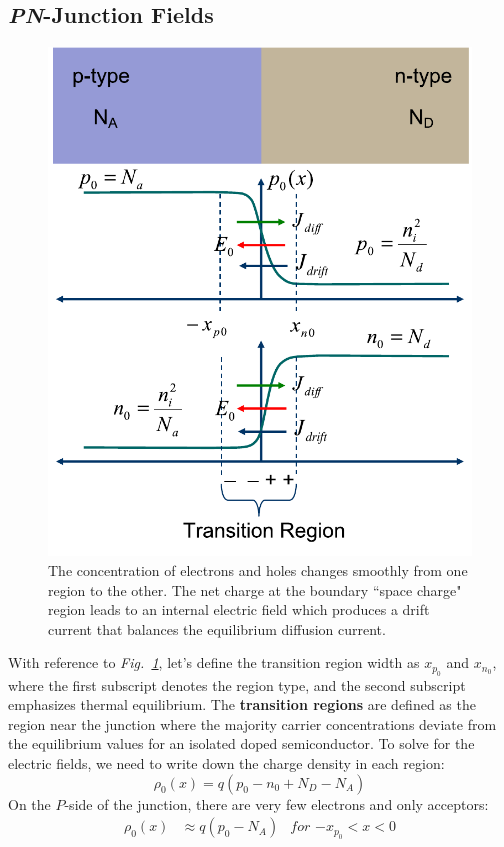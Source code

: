\subsection{\emph{PN}-Junction Fields}
\begin{figure}[tb]
\centering
\includegraphics[width=.5\columnwidth]{slide11}
\caption{The concentration of electrons and holes changes smoothly from one region to the other.  The net charge at the boundary ``space charge" region leads to an internal electric field which produces a drift current that balances the equilibrium diffusion current.}
\label{fig:slide11}
\end{figure}
With reference to \emph{Fig.~\ref{fig:slide11}}, let's define the transition region width as $x_{p_0}$ and $x_{n_0}$, where the first subscript denotes the region type, and the second subscript emphasizes thermal equilibrium.  The \textbf{transition regions} are defined as the region near the junction where the majority carrier concentrations deviate from the equilibrium values for an isolated doped semiconductor.  To solve for the electric fields, we need to write down the charge density in each region:
    \begin{equation} 
        \rho _0(x) = q(p_0 - n_0 + N_D - N_A) 
    \end{equation}
On the $P$-side of the junction, there are very few electrons and only acceptors:
    \begin{align} 
        \rho _0(x) &\approx q(p_0 - N_A) &\textit{for $-x_{p_0} < x < 0$} 
    \end{align}

